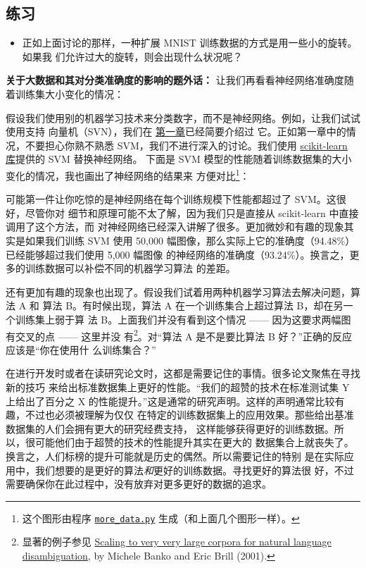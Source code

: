 \subsection*{练习}

\begin{itemize}
\item 正如上面讨论的那样，一种扩展 MNIST 训练数据的方式是用一些小的旋转。如果我
  们允许过大的旋转，则会出现什么状况呢？
\end{itemize}

\textbf{关于大数据和其对分类准确度的影响的题外话：} 让我们再看看神经网络准确度随
着训练集大小变化的情况：

假设我们使用别的机器学习技术来分类数字，而不是神经网络。例如，让我们试试使用支持
向量机（SVN），我们在%
\hyperref[ch:UsingNeuralNetsToRecognizeHandwrittenDigits]{第一章}已经简要介绍过
它。正如第一章中的情况，不要担心你熟不熟悉 SVM，我们不进行深入的讨论。我们使用
\href{http://scikit-learn.org/stable/}{scikit-learn 库}提供的 SVM 替换神经网络。
下面是 SVM 模型的性能随着训练数据集的大小变化的情况，我也画出了神经网络的结果来
方便对比\footnote{这个图形由程序
  \href{https://github.com/mnielsen/neural-networks-and-deep-learning/blob/master/fig/more_data.py}{\lstinline!more_data.py!}
  生成（和上面几个图形一样）。}：

可能第一件让你吃惊的是神经网络在每个训练规模下性能都超过了 SVM。这很好，尽管你对
细节和原理可能不太了解，因为我们只是直接从 scikit-learn 中直接调用了这个方法，而
对神经网络已经深入讲解了很多。更加微妙和有趣的现象其实是如果我们训练 SVM 使用
50,000 幅图像，那么实际上它的准确度（94.48\%）已经能够超过我们使用 5,000 幅图像
的神经网络的准确度（93.24\%）。换言之，更多的训练数据可以补偿不同的机器学习算法
的差距。

还有更加有趣的现象也出现了。假设我们试着用两种机器学习算法去解决问题，算法 A 和
算法 B。有时候出现，算法 A 在一个训练集合上超过算法 B，却在另一个训练集上弱于算
法 B。上面我们并没有看到这个情况 —— 因为这要求两幅图有交叉的点 —— 这里并没
有\footnote{显著的例子参见
  \href{http://dx.doi.org/10.3115/1073012.1073017}{Scaling to very very large
    corpora for natural language disambiguation}, by Michele Banko and Eric
  Brill (2001).}。对``算法 A 是不是要比算法 B 好？''正确的反应应该是``你在使用什
么训练集合？''

在进行开发时或者在读研究论文时，这都是需要记住的事情。很多论文聚焦在寻找新的技巧
来给出标准数据集上更好的性能。``我们的超赞的技术在标准测试集 Y 上给出了百分之 X
的性能提升。''这是通常的研究声明。这样的声明通常比较有趣，不过也必须被理解为仅仅
在特定的训练数据集上的应用效果。那些给出基准数据集的人们会拥有更大的研究经费支持，
这样能够获得更好的训练数据。所以，很可能他们由于超赞的技术的性能提升其实在更大的
数据集合上就丧失了。换言之，人们标榜的提升可能就是历史的偶然。所以需要记住的特别
是在实际应用中，我们想要的是更好的算法\emph{和}更好的训练数据。寻找更好的算法很
好，不过需要确保你在此过程中，没有放弃对更多更好的数据的追求。

